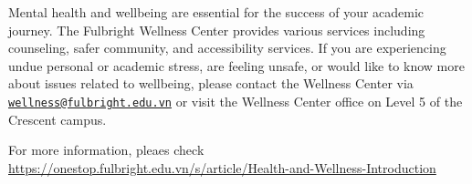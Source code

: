 \documentclass[
  openany]{book}
\begin{document}
Mental health and wellbeing are essential for the success of your academic journey. The
Fulbright Wellness Center provides various services including counseling, safer community,
and accessibility services. If you are experiencing undue personal or academic stress, are
feeling unsafe, or would like to know more about issues related to wellbeing, please contact
the Wellness Center via \href{mailto:wellness@fulbright.edu.vn}{\nolinkurl{wellness@fulbright.edu.vn}} or visit the Wellness Center office on
Level 5 of the Crescent campus.

For more information, pleaes check
\url{https://onestop.fulbright.edu.vn/s/article/Health-and-Wellness-Introduction}
\end{document}
